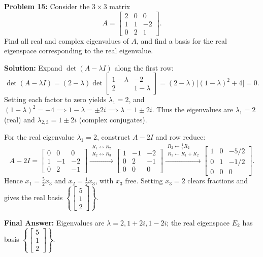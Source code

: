 \documentclass[11pt, letterpaper]{article}
\theoremstyle{definition}
\theoremstyle{remark}
\begin{document}
\vspace{0.4em}
\textbf{Problem 15:}
Consider the $3 \times 3$ matrix
\[
A = \begin{bmatrix} 2 & 0 & 0 \\ 1 & 1 & -2 \\ 0 & 2 & 1 \end{bmatrix}.
\]
Find all real and complex eigenvalues of $A$, and find a basis for the real eigenspace corresponding to the real eigenvalue.

\textbf{Solution:}
Expand $\det(A - \lambda I)$ along the first row:
\[
\det(A - \lambda I) = (2 - \lambda)\det \begin{bmatrix} 1 - \lambda & -2 \\ 2 & 1 - \lambda \end{bmatrix} = (2 - \lambda)\bigl[(1 - \lambda)^2 + 4\bigr] = 0.
\]
Setting each factor to zero yields $\lambda_1 = 2$, and $(1 - \lambda)^2 = -4 \implies 1 - \lambda = \pm 2i \implies \lambda = 1 \pm 2i$. Thus the eigenvalues are $\lambda_1 = 2$ (real) and $\lambda_{2,3} = 1 \pm 2i$ (complex conjugates).

For the real eigenvalue $\lambda_1 = 2$, construct $A - 2I$ and row reduce:
\[
A - 2I = \begin{bmatrix} 0 & 0 & 0 \\ 1 & -1 & -2 \\ 0 & 2 & -1 \end{bmatrix}
\xrightarrow{\substack{R_1 \leftrightarrow R_2 \\ R_2 \leftrightarrow R_3}}
\begin{bmatrix} 1 & -1 & -2 \\ 0 & 2 & -1 \\ 0 & 0 & 0 \end{bmatrix}
\xrightarrow{\substack{R_2 \leftarrow \frac{1}{2}R_2 \\ R_1 \leftarrow R_1 + R_2}}
\begin{bmatrix} 1 & 0 & -5/2 \\ 0 & 1 & -1/2 \\ 0 & 0 & 0 \end{bmatrix}.
\]
Hence $x_1 = \frac{5}{2}x_3$ and $x_2 = \frac{1}{2}x_3$, with $x_3$ free. Setting $x_3 = 2$ clears fractions and gives the real basis $\left\{ \begin{bmatrix} 5 \\ 1 \\ 2 \end{bmatrix} \right\}$.

\textbf{Final Answer:} Eigenvalues are $\lambda = 2, 1 + 2i, 1 - 2i$; the real eigenspace $E_2$ has basis $\left\{ \begin{bmatrix} 5 \\ 1 \\ 2 \end{bmatrix} \right\}$.
\end{document}
